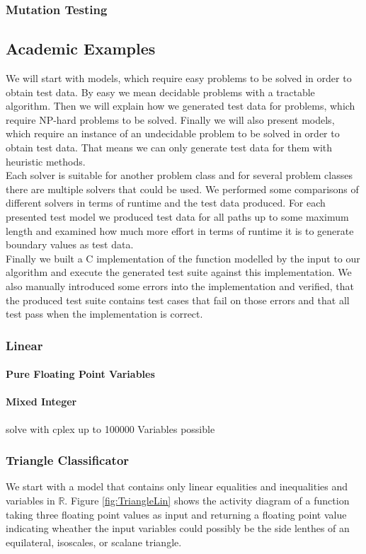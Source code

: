 \subsubsection{Mutation Testing}



\subsection{Academic Examples}
\label{sec:evaluationAcademicModels}
We will start with models, which require easy problems to be solved in order to obtain test data. By easy we mean decidable problems with a tractable algorithm. Then we will explain how we generated test data for problems, which require NP-hard problems to be solved. Finally we will also present models, which require an instance of an undecidable problem to be solved in order to obtain test data. That means we can only generate test data for them with heuristic methods.\\
Each solver is suitable for another problem class and for several problem classes there are multiple solvers that could be used. We performed some comparisons of different solvers in terms of runtime and the test data produced. For each presented test model we produced test data for all paths up to some maximum length and examined how much more effort in terms of runtime it is to generate boundary values as test data.\\
Finally we built a C implementation of the function modelled by the input to our algorithm and execute the generated test suite against this implementation. We also manually introduced some errors into the implementation and verified, that the produced test suite contains test cases that fail on those errors and that all test pass when the implementation is correct.

\subsubsection{Linear}
\paragraph{Pure Floating Point Variables}
\paragraph{Mixed Integer}
solve with cplex up to 100000 Variables possible
\subsubsection{Triangle Classificator}
We start with a model that contains only linear equalities and inequalities and variables in $\mathbb{R}$. Figure \ref{fig:TriangleLin} shows the activity diagram of a function taking three floating point values as input and returning a floating point value indicating wheather the input variables could possibly be the side lenthes of an equilateral, isoscales, or scalane triangle.
